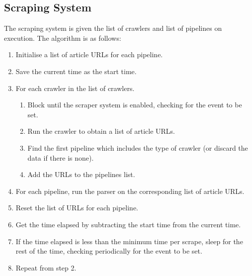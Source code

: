 \documentclass{l4proj}
\begin{document}
\subsection{Scraping System}
The scraping system is given the list of crawlers and list of pipelines on execution. The algorithm is as follows:
\begin{enumerate}
    \item Initialise a list of article URLs for each pipeline.
    \item Save the current time as the start time.
    \item For each crawler in the list of crawlers.
    \begin{enumerate}
        \item Block until the scraper system is enabled, checking for the event to be set.
        \item Run the crawler to obtain a list of article URLs.
        \item Find the first pipeline which includes the type of crawler (or discard the data if there is none).
        \item Add the URLs to the pipelines list.
    \end{enumerate}
    \item For each pipeline, run the parser on the corresponding list of article URLs.
    \item Reset the list of URLs for each pipeline.
    \item Get the time elapsed by subtracting the start time from the current time.
    \item If the time elapsed is less than the minimum time per scrape, sleep for the rest of the time, checking periodically for the event to be set.
    \item Repeat from step 2.
\end{enumerate}
\end{document}
